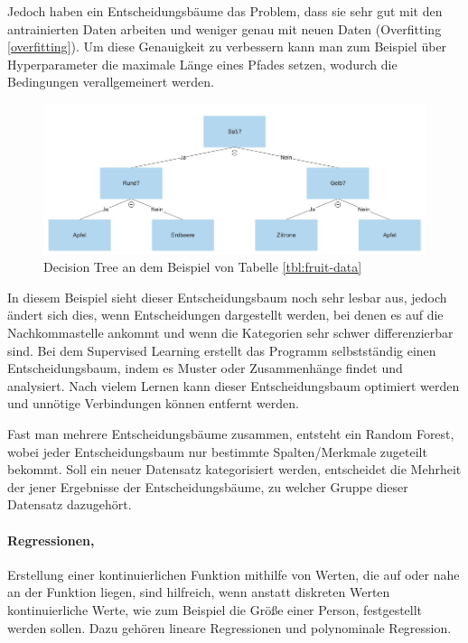 Jedoch haben ein Entscheidungsbäume das Problem, dass sie sehr gut mit den antrainierten Daten arbeiten und weniger genau mit neuen Daten (Overfitting \ref{overfitting}). Um diese Genauigkeit zu verbessern kann man zum Beispiel über Hyperparameter die maximale Länge eines Pfades setzen, wodurch die Bedingungen verallgemeinert werden. 

\begin{figure}[H]
    \centering
    \includegraphics[scale=0.5]{sections/machine-learning/images/decision-tree.png}
    \caption{Decision Tree an dem Beispiel von Tabelle \ref{tbl:fruit-data}}
\end{figure}

In diesem Beispiel sieht dieser Entscheidungsbaum noch sehr lesbar aus, jedoch ändert sich dies, wenn Entscheidungen dargestellt werden, bei denen es auf die Nachkommastelle ankommt und wenn die Kategorien sehr schwer differenzierbar sind. Bei dem Supervised Learning erstellt das Programm selbstständig einen Entscheidungsbaum, indem es Muster oder Zusammenhänge findet und analysiert. Nach vielem Lernen kann dieser Entscheidungsbaum optimiert werden und unnötige Verbindungen können entfernt werden. 

Fast man mehrere Entscheidungsbäume zusammen, entsteht ein Random Forest, wobei jeder Entscheidungsbaum nur bestimmte Spalten/Merkmale zugeteilt bekommt. Soll ein neuer Datensatz kategorisiert werden, entscheidet die Mehrheit der jener Ergebnisse der Entscheidungsbäume, zu welcher Gruppe dieser Datensatz dazugehört.

\paragraph{Regressionen,} Erstellung einer kontinuierlichen Funktion mithilfe von Werten, die auf oder nahe an der Funktion liegen, sind hilfreich, wenn anstatt diskreten Werten kontinuierliche Werte, wie zum Beispiel die Größe einer Person, festgestellt werden sollen. Dazu gehören lineare Regressionen und polynominale Regression.

